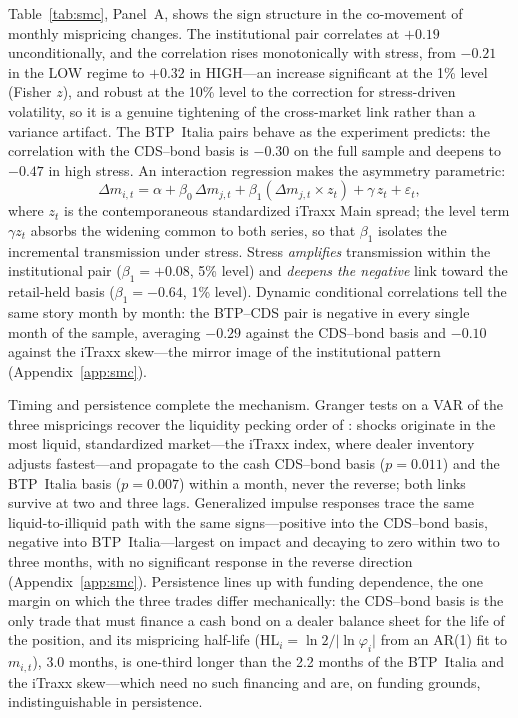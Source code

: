 Table~\ref{tab:smc}, Panel~A, shows the sign structure in the co-movement of
monthly mispricing changes. The institutional pair correlates at $+0.19$
unconditionally, and the correlation rises monotonically with stress, from
$-0.21$ in the LOW regime to $+0.32$ in HIGH---an increase significant at the
1\% level (Fisher $z$), and robust at the 10\% level to the
\citet{forbes2002no} correction for stress-driven volatility, so it is a
genuine tightening of the cross-market link rather than a variance artifact.
The BTP~Italia pairs behave as the experiment predicts: the correlation with
the CDS--bond basis is $-0.30$ on the full sample and deepens to $-0.47$ in
high stress. An interaction regression makes the asymmetry parametric:
\begin{equation}
\Delta m_{i,t} = \alpha + \beta_0\,\Delta m_{j,t}
              + \beta_1\!\left(\Delta m_{j,t}\times z_t\right)
              + \gamma\, z_t + \varepsilon_t,
\end{equation}
where $z_t$ is the contemporaneous standardized iTraxx Main spread; the level
term $\gamma z_t$ absorbs the widening common to both series, so that
$\beta_1$ isolates the incremental transmission under stress. Stress
\emph{amplifies} transmission within the institutional pair
($\beta_1=+0.08$, 5\% level) and \emph{deepens the negative} link toward the
retail-held basis ($\beta_1=-0.64$, 1\% level). Dynamic conditional
correlations tell the same story month by month: the BTP--CDS pair is negative
in every single month of the sample, averaging $-0.29$ against the CDS--bond
basis and $-0.10$ against the iTraxx skew---the mirror image of the
institutional pattern (Appendix~\ref{app:smc}).

Timing and persistence complete the mechanism. Granger tests on a VAR of the
three mispricings recover the liquidity pecking order of
\citet{mitchell2012arbitrage}: shocks originate in the most liquid,
standardized market---the iTraxx index, where dealer inventory adjusts
fastest---and propagate to the cash CDS--bond basis ($p=0.011$) and the
BTP~Italia basis ($p=0.007$) within a month, never the reverse; both links
survive at two and three lags. Generalized impulse responses trace the same
liquid-to-illiquid path with the same signs---positive into the CDS--bond
basis, negative into BTP~Italia---largest on impact and decaying to zero
within two to three months, with no significant response in the reverse
direction (Appendix~\ref{app:smc}). Persistence lines up with funding
dependence, the one margin on which the three trades differ mechanically: the
CDS--bond basis is the only trade that must finance a cash bond on a dealer
balance sheet for the life of the position, and its mispricing half-life
($\mathrm{HL}_i=\ln 2/\lvert\ln\varphi_i\rvert$ from an AR(1) fit to
$m_{i,t}$), 3.0
months, is one-third longer than the 2.2 months of the BTP~Italia and the
iTraxx skew---which need no such financing and are, on funding grounds,
indistinguishable in persistence.

